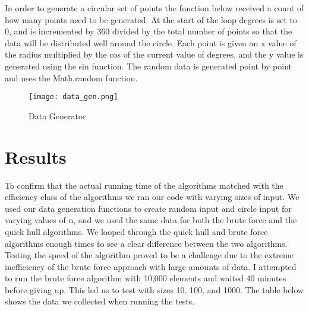 \documentclass[a4paper, 12pt]{article}
\begin{document}
{In order to generate a circular set of points the function below received a count of how many points need to be generated. At the start of the loop degrees is set to 0, and is incremented by 360 divided by the total number of points so that the data will be distributed well around the circle. Each point is given an x value of the radius multiplied by the cos of the current value of degrees, and the y value is generated using the sin function. The random data is generated point by point and uses the Math.random function.
  \begin{figure}[H]
    \begin{center}
    \texttt{[image: data\_gen.png]}
  \end{center}
    \caption{Data Generator}
    \label{fig:data_gen}
  \end{figure} 

  \section{Results}
To confirm that the actual running time of the algorithms matched with the efficiency class of the algorithms we ran our code with varying sizes of input. We used our data generation functions to create random input and circle input for varying values of n, and we used the same data for both the brute force and the quick hull algorithms. We looped through the quick hull and brute force algorithms enough times to see a clear difference between the two algorithms. \\

Testing the speed of the algorithm proved to be a challenge due to the extreme inefficiency of the brute force approach with large amounts of data. I attempted to run the brute force algorithm with 10,000 elements and waited 40 minutes before giving up. This led us to test with sizes 10, 100, and 1000. The table below shows the data we collected when running the tests.

}
\end{document}
